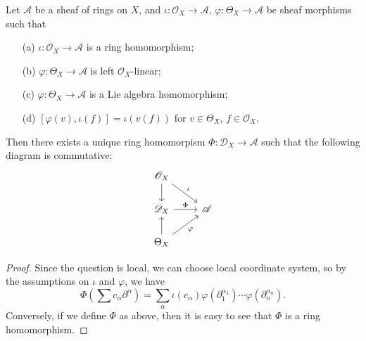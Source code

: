 \begin{proposition}\label{D-module ring D_X generating relation}
Let $\mathscr{A}$ be a sheaf of rings on $X$, and $\iota:\mathscr{O}_X\to\mathscr{A}$, $\varphi:\Theta_X\to\mathscr{A}$ be sheaf morphisms such that
\begin{enumerate}
    \item[(a)] $\iota:\mathscr{O}_X\to\mathscr{A}$ is a ring homomorphism;
    \item[(b)] $\varphi:\Theta_X\to\mathscr{A}$ is left $\mathscr{O}_X$-linear;
    \item[(c)] $\varphi:\Theta_X\to\mathscr{A}$ is a Lie algebra homomorphism;
    \item[(d)] $[\varphi(v),\iota(f)]=\iota(v(f))$ for $v\in\Theta_X$, $f\in\mathscr{O}_X$.
\end{enumerate}
Then there exists a unique ring homomorpism $\Phi:\mathscr{D}_X\to\mathscr{A}$ such that the following diagram is commutative:
\[\begin{tikzcd}
\mathscr{O}_X\ar[d]\ar[rd,"\iota"]\\
\mathscr{D}_X\ar[r,"\Phi"]&\mathscr{A}\\
\Theta_X\ar[u]\ar[ru,swap,"\varphi"]
\end{tikzcd}\]
\end{proposition}
\begin{proof}
Since the question is local, we can choose local coordinate system, so by the assumptions on $\iota$ and $\varphi$, we have
\[\Phi(\sum c_\alpha\partial^\alpha)=\sum_\alpha \iota(c_\alpha)\varphi(\partial_1^{\alpha_1})\cdots\varphi(\partial_n^{\alpha_n}).\]
Conversely, if we define $\Phi$ as above, then it is easy to see that $\Phi$ is a ring homomorphism.
\end{proof}


